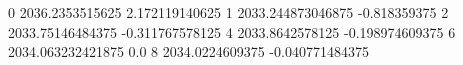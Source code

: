 0 2036.2353515625 2.172119140625
1 2033.244873046875 -0.818359375
2 2033.75146484375 -0.311767578125
4 2033.8642578125 -0.198974609375
6 2034.063232421875 0.0
8 2034.0224609375 -0.040771484375

